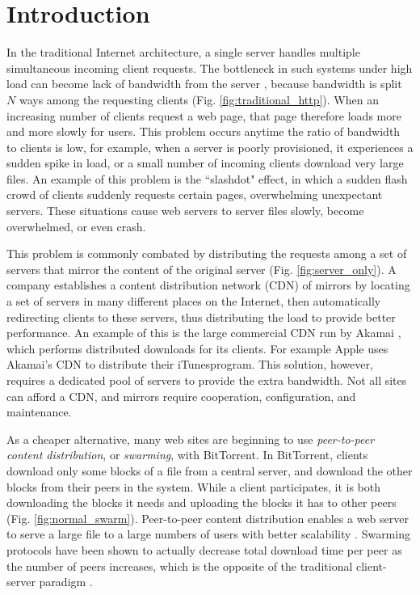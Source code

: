\chapter {Introduction}

In the traditional Internet architecture, a single server handles multiple simultaneous incoming client requests.  
The bottleneck in such systems under high load can become lack of bandwidth from the server \cite{coopnet}, because bandwidth is split $N$ 
ways among the requesting clients (Fig. \ref{fig:traditional_http}).  When an increasing number of clients request a web page, that page 
therefore loads more and more slowly for users.  This problem occurs anytime the ratio of bandwidth to clients is low, for example, when a server 
is poorly provisioned, it experiences a sudden spike in load, or a small number of incoming clients download very large files.  An example of this problem 
is the ``slashdot" effect, in which a sudden flash crowd of clients suddenly requests certain pages, overwhelming unexpectant servers.  
These situations cause web servers to server files slowly, become overwhelmed, or even crash.

This problem is commonly combated by distributing the requests among a set of servers that mirror the content of the original server (Fig. \ref{fig:server_only}).  
A company establishes a content distribution network (CDN) of mirrors by locating a set of servers in many different places on the Internet, then automatically redirecting clients to these servers, thus 
distributing the load to provide better performance.  An example of this is the large commercial CDN run by Akamai \cite{akamai}, which performs distributed
downloads for its clients.  For example Apple uses Akamai's CDN to distribute their iTunes\texttrademark   program.  This solution,  however, requires a dedicated pool of 
servers to provide the extra bandwidth.  Not all sites can afford a CDN, and  mirrors require cooperation, configuration, and maintenance.

As a cheaper alternative, many web sites are beginning to use \emph{peer-to-peer content distribution}, or \emph{swarming}, with BitTorrent.  In BitTorrent, clients 
download only some blocks of a file from a central server, and download the other blocks from their peers in the system.  While a client participates, it is both downloading 
the  blocks it needs and uploading the blocks it has to other peers (Fig. \ref{fig:normal_swarm}).  Peer-to-peer content distribution enables a 
web server to serve a large file to a large numbers of users with better scalability \cite{zappala}. Swarming protocols have been shown to actually decrease total download 
time per peer as the number of peers increases, which is the opposite of the traditional client-server paradigm \cite{slurpie}. 

